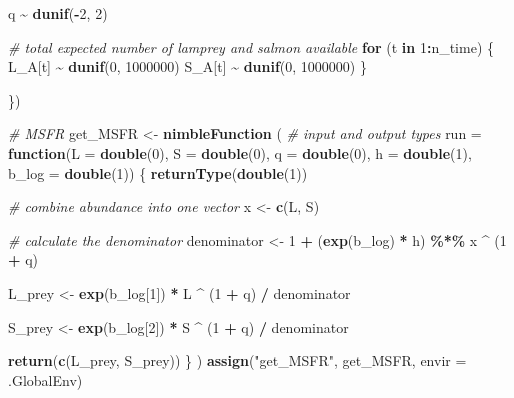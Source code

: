 \documentclass[
]{article}
\newenvironment{Shaded}{\begin{snugshade}}{\end{snugshade}}
\newcommand{\AttributeTok}[1]{\textcolor[rgb]{0.13,0.29,0.53}{#1}}
\newcommand{\CommentTok}[1]{\textcolor[rgb]{0.56,0.35,0.01}{\textit{#1}}}
\newcommand{\ControlFlowTok}[1]{\textcolor[rgb]{0.13,0.29,0.53}{\textbf{#1}}}
\newcommand{\DecValTok}[1]{\textcolor[rgb]{0.00,0.00,0.81}{#1}}
\newcommand{\FunctionTok}[1]{\textcolor[rgb]{0.13,0.29,0.53}{\textbf{#1}}}
\newcommand{\NormalTok}[1]{#1}
\newcommand{\OtherTok}[1]{\textcolor[rgb]{0.56,0.35,0.01}{#1}}
\newcommand{\SpecialCharTok}[1]{\textcolor[rgb]{0.81,0.36,0.00}{\textbf{#1}}}
\newcommand{\StringTok}[1]{\textcolor[rgb]{0.31,0.60,0.02}{#1}}
\begin{document}
\begin{Shaded}
\begin{Highlighting}[]
\NormalTok{  q }\SpecialCharTok{\textasciitilde{}} \FunctionTok{dunif}\NormalTok{(}\SpecialCharTok{{-}}\DecValTok{2}\NormalTok{, }\DecValTok{2}\NormalTok{)}
  
  \CommentTok{\# total expected number of lamprey and salmon available}
  \ControlFlowTok{for}\NormalTok{ (t }\ControlFlowTok{in} \DecValTok{1}\SpecialCharTok{:}\NormalTok{n\_time) \{}
\NormalTok{    L\_A[t] }\SpecialCharTok{\textasciitilde{}} \FunctionTok{dunif}\NormalTok{(}\DecValTok{0}\NormalTok{, }\DecValTok{1000000}\NormalTok{)}
\NormalTok{    S\_A[t] }\SpecialCharTok{\textasciitilde{}} \FunctionTok{dunif}\NormalTok{(}\DecValTok{0}\NormalTok{, }\DecValTok{1000000}\NormalTok{)}
\NormalTok{  \}}
  
\NormalTok{\})}

\CommentTok{\# MSFR}
\NormalTok{get\_MSFR }\OtherTok{\textless{}{-}} \FunctionTok{nimbleFunction}\NormalTok{ (}
  \CommentTok{\# input and output types}
  \AttributeTok{run =} \ControlFlowTok{function}\NormalTok{(}\AttributeTok{L =} \FunctionTok{double}\NormalTok{(}\DecValTok{0}\NormalTok{), }\AttributeTok{S =} \FunctionTok{double}\NormalTok{(}\DecValTok{0}\NormalTok{), }
                 \AttributeTok{q =} \FunctionTok{double}\NormalTok{(}\DecValTok{0}\NormalTok{), }\AttributeTok{h =} \FunctionTok{double}\NormalTok{(}\DecValTok{1}\NormalTok{),}
                 \AttributeTok{b\_log =} \FunctionTok{double}\NormalTok{(}\DecValTok{1}\NormalTok{))}
\NormalTok{  \{}
    \FunctionTok{returnType}\NormalTok{(}\FunctionTok{double}\NormalTok{(}\DecValTok{1}\NormalTok{))}
    
    \CommentTok{\# combine abundance into one vector}
\NormalTok{    x }\OtherTok{\textless{}{-}} \FunctionTok{c}\NormalTok{(L, S)}
    
    \CommentTok{\# calculate the denominator}
\NormalTok{    denominator }\OtherTok{\textless{}{-}} \DecValTok{1} \SpecialCharTok{+}\NormalTok{ (}\FunctionTok{exp}\NormalTok{(b\_log) }\SpecialCharTok{*}\NormalTok{ h) }\SpecialCharTok{\%*\%}\NormalTok{ x }\SpecialCharTok{\^{}}\NormalTok{ (}\DecValTok{1} \SpecialCharTok{+}\NormalTok{ q)}
    
\NormalTok{    L\_prey }\OtherTok{\textless{}{-}} \FunctionTok{exp}\NormalTok{(b\_log[}\DecValTok{1}\NormalTok{]) }\SpecialCharTok{*}\NormalTok{ L }\SpecialCharTok{\^{}}\NormalTok{ (}\DecValTok{1} \SpecialCharTok{+}\NormalTok{ q) }\SpecialCharTok{/}\NormalTok{ denominator}
    
\NormalTok{    S\_prey }\OtherTok{\textless{}{-}} \FunctionTok{exp}\NormalTok{(b\_log[}\DecValTok{2}\NormalTok{]) }\SpecialCharTok{*}\NormalTok{ S }\SpecialCharTok{\^{}}\NormalTok{ (}\DecValTok{1} \SpecialCharTok{+}\NormalTok{ q) }\SpecialCharTok{/}\NormalTok{ denominator}
    
    \FunctionTok{return}\NormalTok{(}\FunctionTok{c}\NormalTok{(L\_prey, S\_prey))}
\NormalTok{  \}}
\NormalTok{)}
\FunctionTok{assign}\NormalTok{(}\StringTok{"get\_MSFR"}\NormalTok{, get\_MSFR, }\AttributeTok{envir =}\NormalTok{ .GlobalEnv)}
\end{Highlighting}
\end{Shaded}
\end{document}
